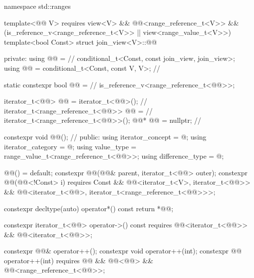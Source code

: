 %
\begin{codeblock}
namespace std::ranges {
  template<@@ V>
    requires view<V> && @@<range_reference_t<V>> &&
             (is_reference_v<range_reference_t<V>> ||
              view<range_value_t<V>>)
  template<bool Const>
  struct join_view<V>::@@ {
  private:
    using @@ =                                              // \expos
      conditional_t<Const, const join_view, join_view>;
    using @@   = conditional_t<Const, const V, V>;            // \expos

    static constexpr bool @@ =                      // \expos
      is_reference_v<range_reference_t<@@>>;

    iterator_t<@@> @@ = iterator_t<@@>();               // \expos
    iterator_t<range_reference_t<@@>> @@ =                // \expos
      iterator_t<range_reference_t<@@>>();
    @@* @@ = nullptr;                                  // \expos

    constexpr void @@();                                   // \expos
  public:
    using iterator_concept  = @\seebelow@;
    using iterator_category = @\seebelow@;
    using value_type        = range_value_t<range_reference_t<@@>>;
    using difference_type   = @\seebelow@;

    @@() = default;
    constexpr @@(@@& parent, iterator_t<@@> outer);
    constexpr @@(@@<!Const> i)
      requires Const &&
               @@<iterator_t<V>, iterator_t<@@>> &&
               @@<iterator_t<@@>,
                              iterator_t<range_reference_t<@@>>>;

    constexpr decltype(auto) operator*() const { return *@@; }

    constexpr iterator_t<@@> operator->() const
      requires @@<iterator_t<@@>> && @@<iterator_t<@@>>;

    constexpr @@& operator++();
    constexpr void operator++(int);
    constexpr @@ operator++(int)
      requires @@ && @@<@@> &&
               @@<range_reference_t<@@>>;

}}
\end{codeblock}
